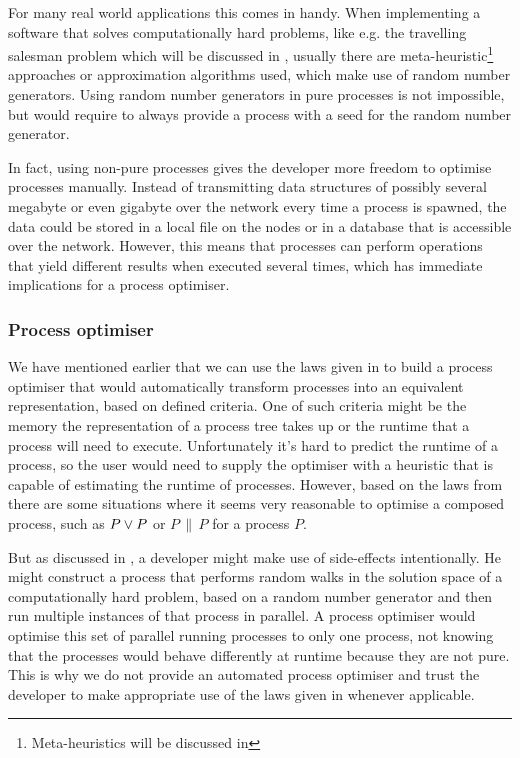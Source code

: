 For many real world applications this comes in handy. When implementing a software that solves computationally hard problems, like e.g. the travelling salesman problem which will be discussed in , usually there are meta-heuristic\footnote{Meta-heuristics will be discussed in } approaches or approximation algorithms \cite{rolf2006approximationsalgorithmen} used, which make use of random number generators. Using random number generators in pure processes is not impossible, but would require to always provide a process with a seed for the random number generator.

In fact, using non-pure processes gives the developer more freedom to optimise processes manually. Instead of transmitting data structures of possibly several megabyte or even gigabyte over the network every time a process is spawned, the data could be stored in a local file on the nodes or in a database that is accessible over the network. However, this means that processes can perform operations that yield different results when executed several times, which has immediate implications for a process optimiser.

\subsubsection{Process optimiser}
We have mentioned earlier that we can use the laws given in  to build a process optimiser that would automatically transform processes into an equivalent representation, based on defined criteria. One of such criteria might be the memory the representation of a process tree takes up or the runtime that a process will need to execute. Unfortunately it's hard to predict the runtime of a process, so the user would need to supply the optimiser with a heuristic that is capable of estimating the runtime of processes. However, based on the laws from  there are some situations where it seems very reasonable to optimise a composed process, such as $P \vee P$ or $P \,\parallel\, P$ for a process $P$.

But as discussed in , a developer might make use of side-effects intentionally. He might construct a process that performs random walks in the solution space of a computationally hard problem, based on a random number generator and then run multiple instances of that process in parallel. A process optimiser would optimise this set of parallel running processes to only one process, not knowing that the processes would behave differently at runtime because they are not pure. This is why we do not provide an automated process optimiser and trust the developer to make appropriate use of the laws given in  whenever applicable.

